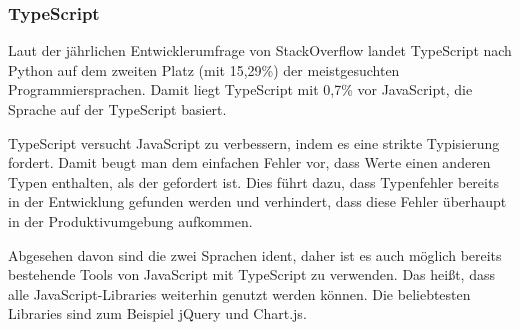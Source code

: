 \subsubsection{TypeScript}

Laut der jährlichen Entwicklerumfrage von StackOverflow landet TypeScript nach Python auf dem zweiten Platz (mit 15,29\%) der meistgesuchten Programmiersprachen. Damit liegt TypeScript mit 0,7\% vor JavaScript, die Sprache auf der TypeScript basiert. \cite{SFT}

TypeScript versucht JavaScript zu verbessern, indem es eine strikte Typisierung fordert. Damit beugt man dem einfachen Fehler vor, dass Werte einen anderen Typen enthalten, als der gefordert ist. Dies führt dazu, dass Typenfehler bereits in der Entwicklung gefunden werden und verhindert, dass diese Fehler überhaupt in der Produktivumgebung aufkommen.

Abgesehen davon sind die zwei Sprachen ident, daher ist es auch möglich bereits bestehende Tools von JavaScript mit TypeScript zu verwenden. Das heißt, dass alle JavaScript-Libraries weiterhin genutzt werden können. Die beliebtesten Libraries sind zum Beispiel jQuery und Chart.js.
